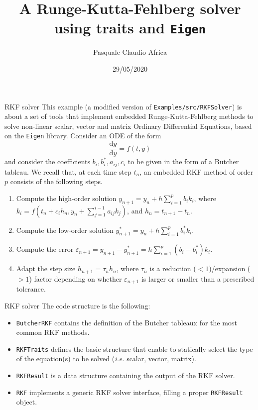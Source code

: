 \documentclass[10pt]{beamer}
\begin{document}
    \title{A Runge-Kutta-Fehlberg solver\protect\\ using traits and \texttt{Eigen}}
    \author{Pasquale Claudio Africa}
    \date{29/05/2020}

\begin{frame}
    \maketitle
\end{frame}

\begin{frame}{RKF solver}
This example (a modified version of \texttt{Examples/src/RKFSolver}) is about a set of tools that implement embedded Runge-Kutta-Fehlberg methods to solve non-linear scalar, vector and matrix Ordinary Differential Equations, based on the \texttt{Eigen} library.
\vfill
Consider an ODE of the form
\begin{equation*}
\frac{\mathrm{d} y}{\mathrm{d} y} = f(t, y)
\end{equation*}
and consider the coefficients \(b_i, b_i^*, a_{ij}, c_i\) to be given in the form of a Butcher tableau.
We recall that, at each time step \(t_n\), an embedded RKF method of order \(p\) consists of the following steps.
\begin{enumerate}
\item Compute the high-order solution \(y_{n+1} = y_{n} + h \sum_{i=1}^p b_i k_i\), where \(k_i = f\left(t_n + c_i h_n, y_n + \sum_{j=1}^{i-1}a_{ij}k_j\right)\), and \(h_n = t_{n+1} - t_n\).
\item Compute the low-order solution \(y_{n+1}^* = y_{n} + h \sum_{i=1}^p b_i^* k_i\).
\item Compute the error \(\varepsilon_{n+1} = y_{n+1} - y_{n+1}^* = h\sum_{i=1}^p(b_i - b_i^*)k_i\).
\item Adapt the step size \(h_{n+1} = \tau_{n} h_{n}\), where \(\tau_{n}\) is a reduction (\(<1\))/expansion (\(>1\)) factor depending on whether \(\varepsilon_{n+1}\) is larger or smaller than a prescribed tolerance.
\end{enumerate}
\end{frame}

\begin{frame}{RKF solver}
The code structure is the following:
\begin{itemize}
\item \texttt{ButcherRKF} contains the definition of the Butcher tableaux for the most common RKF methods.
\item \texttt{RKFTraits} defines the basic structure that enable to statically select the type of the equation(s) to be solved (\textit{i.e.} scalar, vector, matrix).
\item \texttt{RKFResult} is a data structure containing the output of the RKF solver.
\item \texttt{RKF} implements a generic RKF solver interface, filling a proper \texttt{RKFResult} object.
\end{itemize}
\end{frame}
\end{document}
